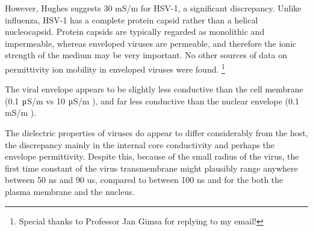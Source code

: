 \documentclass[fleqn,10pt]{paper}
\begin{document}


However, Hughes suggests 30 mS/m for HSV-1, a significant discrepancy. Unlike influenza, HSV-1 has a complete protein capsid rather than a helical nucleocapsid. Protein capsids are typically regarded as monolithic and impermeable, whereas enveloped viruses are permeable, and therefore the ionic strength of the medium may be very important. No other sources of data on permittivity ion mobility in enveloped viruses were found.  \footnote{Special thanks to Professor Jan Gimsa for replying to my email!}

The viral envelope appears to be slightly less conductive than the cell membrane (0.1 $\micro$S/m \cite{New1999} vs 10 $\micro$S/m \cite{Study2001}), and far less conductive than the nuclear envelope (0.1 $\text{m}$S/m \cite{Study2001}).


The dielectric properties of viruses do appear to differ considerably from the host, the discrepancy mainly in the internal core conductivity and perhaps the envelope permittivity. Despite this, because of the small radius of the virus, the first time constant of the virus transmembrane might plausibly range anywhere between 50 ns and 90 us, compared to between 100 ns and  for the both the plasma membrane and the nucleus.


\end{document}
